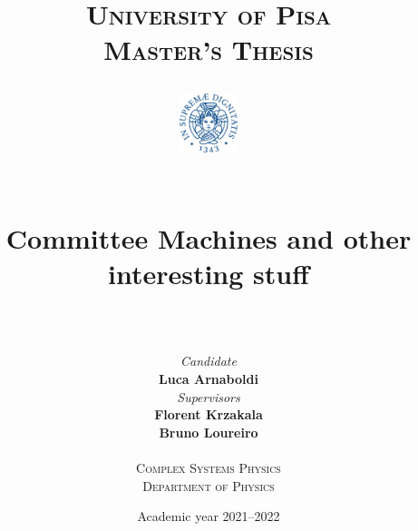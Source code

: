\title{
  \textsc{University of Pisa}\\
  \textsc{Master's Thesis}\\

  \begin{figure}[h]
    \centering
    \includegraphics[width=0.15\textwidth]{figures/unipi_logo.pdf}
  \end{figure}


  \hrulefill \\
  \vspace{8pt}
  \Huge \textbf{Committee Machines and other interesting stuff} \\
  \hrulefill \\
  \vspace{20pt}
}


\author{
  \begin{minipage}[h]{0.45\linewidth}
    \begin{flushleft}
      \textit{Candidate} \\
      \textbf{Luca Arnaboldi}
    \end{flushleft}
  \end{minipage}
  \begin{minipage}[h]{0.45\linewidth}
    \begin{flushright}
      \textit{Supervisors} \\
      \textbf{Florent Krzakala} \\
      \textbf{Bruno Loureiro}
    \end{flushright}
  \end{minipage}
  \hspace{50pt}
  \vspace{30pt} \\
  \textsc{Complex Systems Physics}\\
  \textsc{Department of Physics}
}
\date{Academic year 2021--2022}
  
